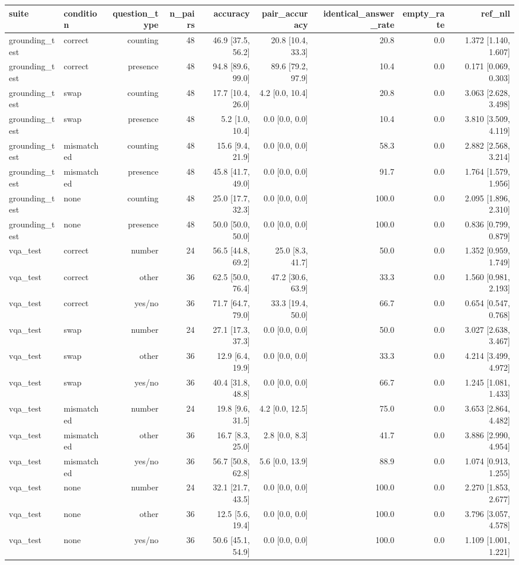 \begin{tabular}{llrrrrrrr}
\toprule
suite & condition & question\_type & n\_pairs & accuracy & pair\_accuracy & identical\_answer\_rate & empty\_rate & ref\_nll \\
\midrule
grounding\_test & correct & counting & 48 & 46.9 [37.5, 56.2] & 20.8 [10.4, 33.3] & 20.8 & 0.0 & 1.372 [1.140, 1.607] \\
grounding\_test & correct & presence & 48 & 94.8 [89.6, 99.0] & 89.6 [79.2, 97.9] & 10.4 & 0.0 & 0.171 [0.069, 0.303] \\
grounding\_test & swap & counting & 48 & 17.7 [10.4, 26.0] & 4.2 [0.0, 10.4] & 20.8 & 0.0 & 3.063 [2.628, 3.498] \\
grounding\_test & swap & presence & 48 & 5.2 [1.0, 10.4] & 0.0 [0.0, 0.0] & 10.4 & 0.0 & 3.810 [3.509, 4.119] \\
grounding\_test & mismatched & counting & 48 & 15.6 [9.4, 21.9] & 0.0 [0.0, 0.0] & 58.3 & 0.0 & 2.882 [2.568, 3.214] \\
grounding\_test & mismatched & presence & 48 & 45.8 [41.7, 49.0] & 0.0 [0.0, 0.0] & 91.7 & 0.0 & 1.764 [1.579, 1.956] \\
grounding\_test & none & counting & 48 & 25.0 [17.7, 32.3] & 0.0 [0.0, 0.0] & 100.0 & 0.0 & 2.095 [1.896, 2.310] \\
grounding\_test & none & presence & 48 & 50.0 [50.0, 50.0] & 0.0 [0.0, 0.0] & 100.0 & 0.0 & 0.836 [0.799, 0.879] \\
vqa\_test & correct & number & 24 & 56.5 [44.8, 69.2] & 25.0 [8.3, 41.7] & 50.0 & 0.0 & 1.352 [0.959, 1.749] \\
vqa\_test & correct & other & 36 & 62.5 [50.0, 76.4] & 47.2 [30.6, 63.9] & 33.3 & 0.0 & 1.560 [0.981, 2.193] \\
vqa\_test & correct & yes/no & 36 & 71.7 [64.7, 79.0] & 33.3 [19.4, 50.0] & 66.7 & 0.0 & 0.654 [0.547, 0.768] \\
vqa\_test & swap & number & 24 & 27.1 [17.3, 37.3] & 0.0 [0.0, 0.0] & 50.0 & 0.0 & 3.027 [2.638, 3.467] \\
vqa\_test & swap & other & 36 & 12.9 [6.4, 19.9] & 0.0 [0.0, 0.0] & 33.3 & 0.0 & 4.214 [3.499, 4.972] \\
vqa\_test & swap & yes/no & 36 & 40.4 [31.8, 48.8] & 0.0 [0.0, 0.0] & 66.7 & 0.0 & 1.245 [1.081, 1.433] \\
vqa\_test & mismatched & number & 24 & 19.8 [9.6, 31.5] & 4.2 [0.0, 12.5] & 75.0 & 0.0 & 3.653 [2.864, 4.482] \\
vqa\_test & mismatched & other & 36 & 16.7 [8.3, 25.0] & 2.8 [0.0, 8.3] & 41.7 & 0.0 & 3.886 [2.990, 4.954] \\
vqa\_test & mismatched & yes/no & 36 & 56.7 [50.8, 62.8] & 5.6 [0.0, 13.9] & 88.9 & 0.0 & 1.074 [0.913, 1.255] \\
vqa\_test & none & number & 24 & 32.1 [21.7, 43.5] & 0.0 [0.0, 0.0] & 100.0 & 0.0 & 2.270 [1.853, 2.677] \\
vqa\_test & none & other & 36 & 12.5 [5.6, 19.4] & 0.0 [0.0, 0.0] & 100.0 & 0.0 & 3.796 [3.057, 4.578] \\
vqa\_test & none & yes/no & 36 & 50.6 [45.1, 54.9] & 0.0 [0.0, 0.0] & 100.0 & 0.0 & 1.109 [1.001, 1.221] \\
\bottomrule
\end{tabular}
